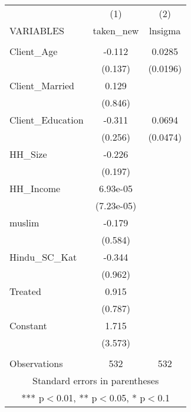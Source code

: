 \begin{tabular}{lcc} \hline
 & (1) & (2) \\
VARIABLES & taken\_new & lnsigma \\ \hline
 &  &  \\
Client\_Age & -0.112 & 0.0285 \\
 & (0.137) & (0.0196) \\
Client\_Married & 0.129 &  \\
 & (0.846) &  \\
Client\_Education & -0.311 & 0.0694 \\
 & (0.256) & (0.0474) \\
HH\_Size & -0.226 &  \\
 & (0.197) &  \\
HH\_Income & 6.93e-05 &  \\
 & (7.23e-05) &  \\
muslim & -0.179 &  \\
 & (0.584) &  \\
Hindu\_SC\_Kat & -0.344 &  \\
 & (0.962) &  \\
Treated & 0.915 &  \\
 & (0.787) &  \\
Constant & 1.715 &  \\
 & (3.573) &  \\
 &  &  \\
 Observations & 532 & 532 \\ \hline
\multicolumn{3}{c}{ Standard errors in parentheses} \\
\multicolumn{3}{c}{ *** p$<$0.01, ** p$<$0.05, * p$<$0.1} \\
\end{tabular}
